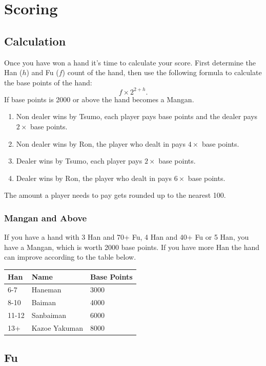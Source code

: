 \documentclass[a4paper,12pt]{article}
\begin{document}
\newpage
\section{Scoring}

\subsection{Calculation}

Once you have won a hand it's time to calculate your score. First 
determine the Han ($h$) and Fu ($f$) count of the hand, then use the 
following formula to calculate the base points of the hand:
$$f\times2^{2+h}.$$
If base points is 2000 or above the hand becomes a Mangan.
\begin{enumerate}
\item Non dealer wins by Tsumo, each player pays base points 
and the dealer pays  $2\times$ base points.
\item Non dealer wins by Ron, the player who dealt in pays 
$4\times$ base points.
\item Dealer wins by Tsumo, each player pays $2\times$ base 
points.
\item Dealer wins by Ron, the player who dealt in pays $6\times$
base points.
\end{enumerate}
The amount a player needs to pay gets rounded up to the nearest 100.

\subsubsection{Mangan and Above}

If you have a hand with 3 Han and 70+ Fu, 4 Han and 40+ Fu or 5 Han, you 
have a Mangan, which is worth 2000 base points. If you have more Han the 
hand can improve according to the table below.

\begin{tabular}{|l|l|l|}
\hline
Han & Name & Base Points \\
\hline
6-7 & Haneman & 3000 \\
8-10 & Baiman & 4000 \\
11-12 & Sanbaiman & 6000 \\
13+ & Kazoe Yakuman & 8000 \\
\hline
\end{tabular}

\subsection{Fu}
\end{document}

